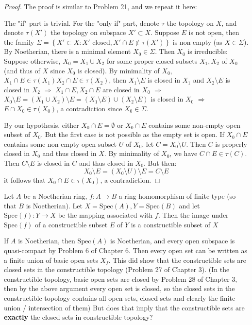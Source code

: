 \documentclass{solution}
\begin{document}
\begin{proof}
    The proof is similar to Problem 21, and we repeat it here:

    The "if" part is trivial. For the "only if" part, denote $\tau$ the topology on $X$, and denote $\tau(X')$ the topology on subspace $X' \subset X$. Suppose $E$ is not open, then the family $\Sigma = \left\lbrace X' \subset X: X' \text{ closed}, X' \cap E \notin \tau(X') \right\rbrace$ is non-empty (as $X \in \Sigma$). By Noetherian, there is a minimal element $X_0 \in \Sigma$. Then $X_0$ is irreducible: Suppose otherwise, $X_0 = X_1 \cup X_2$ for some proper closed subsets $X_1, X_2$ of $X_0$ (and thus of $X$ since $X_0$ is closed). By minimality of $X_0$, $X_1 \cap E \in \tau(X_1) X_2 \cap E \in \tau(X_2)$, then $X_1 \setminus E$ is closed in $X_1$ and $X_2 \setminus E$ is closed in $X_2$ $\Rightarrow$ $X_1 \cap E, X_2 \cap E$ are closed in $X_0$ $\Rightarrow$ $X_0 \setminus E = (X_1 \cup X_2) \setminus E = (X_1 \setminus E) \cup (X_2 \setminus E)$ is closed in $X_0$ $\Rightarrow$ $E \cap X_0 \in \tau(X_0)$, a contradiction since $X_0 \in \Sigma$.

    By our hypothesis, either $X_0 \cap E = \emptyset$ or $X_0 \cap E$ contains some non-empty open subset of $X_0$. But the first case is not possible as the empty set is open. If $X_0 \cap E$ contains some non-empty open subset $U$ of $X_0$, let $C = X_0 \setminus U$. Then $C$ is properly closed in $X_0$ and thus closed in $X$. By minimality of $X_0$, we have $C \cap E \in \tau(C)$. Then $C \setminus E$ is closed in $C$ and thus closed in $X_0$. But then:
    $$X_0 \setminus E = (X_0 \setminus U) \setminus E = C \setminus E$$
    it follows that $X_0 \cap E \in \tau(X_0)$, a contradiction.
\end{proof}

\begin{problem}
    Let $A$ be a Noetherian ring, $f: A \rightarrow B$ a ring homomorphism of finite type (so that $B$ is Noetherian). Let $X = \mathrm{Spec}(A), Y = \mathrm{Spec}(B)$ and let $\mathrm{Spec}(f): Y \rightarrow X$ be the mapping associated with $f$. Then the image under $\mathrm{Spec}(f)$ of a constructible subset $E$ of $Y$ is a constructible subset of $X$
\end{problem}

{\color{red} If $A$ is Noetherian, then $\mathrm{Spec}(A)$ is Noetherian, and every open subspace is quasi-compact by Problem 6 of Chapter 6. Then every open set can be written as a finite union of basic open sets $X_f$. This did show that the constructible sets are closed sets in the constructible topology (Problem 27 of Chapter 3). (In the constructible topology, basic open sets are closed by Problem 28 of Chapter 3, then by the above argument every open set is closed, so the closed sets in the constructible topology contains all open sets, closed sets and clearly the finite union / intersection of them) But does that imply that the constructible sets are \textbf{exactly} the closed sets in constructible topology? \TODO}
\end{document}
